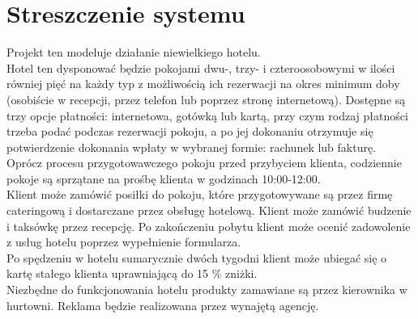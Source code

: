 \documentclass[a4paper, 11pt]{article}
\begin{document}
	
	\tableofcontents
	\vfill
	\newpage	%
	
	
	
	
	
	\section{Streszczenie systemu}
		\indent
		
	
	Projekt ten modeluje działanie niewielkiego hotelu.\\ \indent
	Hotel ten dysponować będzie pokojami dwu-, trzy- i czteroosobowymi w ilości równiej pięć na każdy typ z możliwością ich rezerwacji na okres minimum doby (osobiście w recepcji, przez telefon lub poprzez stronę internetową). Dostępne są trzy opcje płatności: internetowa, gotówką lub kartą, przy czym rodzaj płatności trzeba podać podczas rezerwacji pokoju, a po jej dokonaniu otrzymuje się potwierdzenie dokonania wpłaty w wybranej formie: rachunek lub fakturę. \\ \indent
	Oprócz procesu przygotowawczego pokoju przed przybyciem klienta, codziennie pokoje są sprzątane na prośbę klienta w godzinach 10:00-12:00.  \\ \indent
	Klient może zamówić posiłki do pokoju, które przygotowywane są przez firmę cateringową i dostarczane przez obsługę hotelową. Klient może zamówić budzenie i taksówkę przez recepcję.	Po zakończeniu pobytu klient może ocenić zadowolenie z usług hotelu poprzez wypełnienie formularza.  \\ \indent
	Po spędzeniu w hotelu sumarycznie dwóch tygodni klient może ubiegać się o kartę stałego klienta uprawniającą do 15 \% zniżki.  \\ \indent
	Niezbędne do funkcjonowania hotelu produkty zamawiane są przez kierownika w hurtowni. Reklama będzie realizowana przez wynajętą agencję. \\
		
\end{document}

